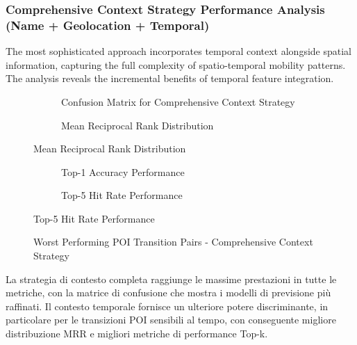 \documentclass[12pt,a4paper]{article}
\begin{document}
\subsubsection{Comprehensive Context Strategy Performance Analysis (Name + Geolocation + Temporal)}

The most sophisticated approach incorporates temporal context alongside spatial information, capturing the full complexity of spatio-temporal mobility patterns. The analysis reveals the incremental benefits of temporal feature integration.

\begin{figure}[h]
\centering
\begin{subfigure}{0.48\textwidth}
\centering
\caption{Confusion Matrix for Comprehensive Context Strategy}
\label{fig:comprehensive_confusion}
\end{subfigure}
\hfill
\begin{subfigure}{0.48\textwidth}
\centering
\caption{Mean Reciprocal Rank Distribution}
\label{fig:comprehensive_mrr}
\end{subfigure}
\end{figure}

\begin{figure}[h]
\centering
\begin{subfigure}{0.48\textwidth}
\centering
\caption{Top-1 Accuracy Performance}
\label{fig:comprehensive_top1}
\end{subfigure}
\hfill
\begin{subfigure}{0.48\textwidth}
\centering
\caption{Top-5 Hit Rate Performance}
\label{fig:comprehensive_top5}
\end{subfigure}
\end{figure}

\begin{figure}[h]
\centering
\caption{Worst Performing POI Transition Pairs - Comprehensive Context Strategy}
\label{fig:comprehensive_worst_pairs}
\end{figure}

La strategia di contesto completa raggiunge le massime prestazioni in tutte le metriche, con la matrice di confusione che mostra i modelli di previsione più raffinati. Il contesto temporale fornisce un ulteriore potere discriminante, in particolare per le transizioni POI sensibili al tempo, con conseguente migliore distribuzione MRR e migliori metriche di performance Top-k.
\end{document}
